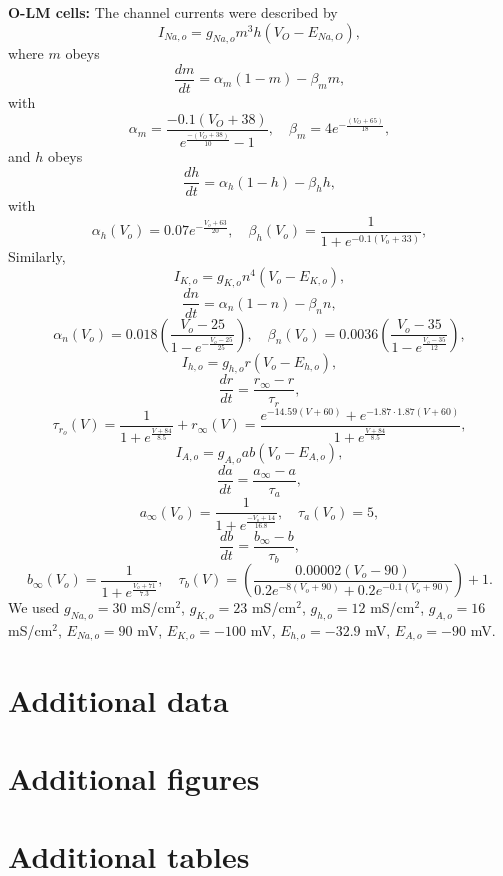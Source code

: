 \noindent
\textbf{O-LM cells:}
The channel currents were described by
\[
    I_{Na,o} = g_{Na,o}m^3h(V_O - E_{Na,O}),
\]
where \( m \) obeys
\[
    \frac{dm}{dt} = \alpha_m(1 - m) - \beta_m m,
\]
with
\[
    \alpha_m = \frac{-0.1(V_O + 38)}{e^\frac{- (V_O+38)}{10} - 1}, \quad \beta_m = 4e^{-\frac{(V_O+65)}{18}},
\]
and \( h \) obeys
\[
    \frac{dh}{dt} = \alpha_h(1 - h) - \beta_h h,
\]
with
\[
    \alpha_{h}(V_o) = 0.07e^{-\frac{V_o+63}{20}}, \quad \beta_{h}(V_o) = \frac{1}{1 + e^{-0.1(V_o+33)}},
\]
Similarly,
\[
    I_{K,o} = g_{K,o} n^4 (V_o - E_{K,o}),
\]
\[
    \frac{dn}{dt} = \alpha_n(1 - n) - \beta_n n,
\]
\[
    \alpha_n(V_o) = 0.018\left(\frac{V_o - 25}{1 - e^{-\frac{V_o - 25}{25}}}\right), \quad \beta_n(V_o) = 0.0036\left(\frac{V_o - 35}{1 - e^{\frac{V_o - 35}{12}}}\right),
\]
\[
    I_{h,o} = g_{h,o}r(V_o - E_{h,o}),
\]
\[
    \frac{dr}{dt} = \frac{r_{\infty} - r}{\tau_r},
\]
\[
    \tau_{r_{o}}(V) = \frac{1}{1 + e^{\frac{V + 84}{8.5}}} + r_{\infty}(V) = \frac{e^{-14.59(V + 60)} + e^{-1.87\cdot1.87(V+60)}}{1 + e^{\frac{V+84}{8.5}}},
\]
\[
    I_{A,o} = g_{A,o}ab(V_o - E_{A,o}),
\]
\[
    \frac{da}{dt} = \frac{a_{\infty} - a}{\tau_a},
\]
\[
    a_{\infty}(V_o) = \frac{1}{1 + e^{\frac{-V_o + 14}{16.8}}}, \quad \tau_a(V_o) = 5,
\]
\[
    \frac{db}{dt} = \frac{b_{\infty} - b}{\tau_b},
\]
\[
    b_{\infty}(V_o) = \frac{1}{1 + e^{\frac{V_o + 71}{7.3}}}, \quad \tau_b(V) = \left(\frac{0.00002(V_o - 90)}{0.2e^{-8(V_o + 90)} + 0.2e^{-0.1(V_o + 90)}}\right) + 1.
\]
We used \( g_{Na,o} = 30 \) mS/cm\(^2\), \( g_{K,o} = 23 \) mS/cm\(^2\), \(
g_{h,o} = 12 \) mS/cm\(^2\), \( g_{A,o} = 16 \) mS/cm\(^2\), \( E_{Na,o} = 90
\) mV, \( E_{K,o} = -100 \) mV, \( E_{h,o} = -32.9 \) mV, \( E_{A,o} = -90 \)
mV.\pagebreak

\section{Additional data}

\section{Additional figures}

\section{Additional tables}


